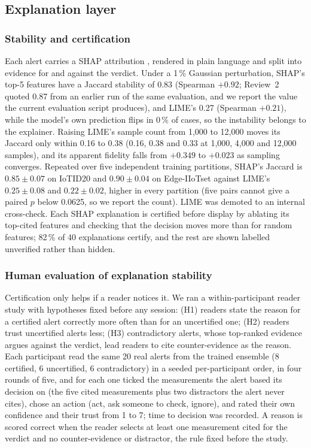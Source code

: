 \subsection{Explanation layer}\label{sec:xai}
\subsubsection{Stability and certification}
Each alert carries a SHAP attribution \cite{lundberg2017}, rendered in plain language and split into evidence for and against the verdict. Under a 1\,\% Gaussian perturbation, SHAP's top-5 features have a Jaccard stability of 0.83 (Spearman $+0.92$; Review~2 quoted 0.87 from an earlier run of the same evaluation, and we report the value the current evaluation script produces), and LIME's \cite{ribeiro2016} 0.27 (Spearman $+0.21$), while the model's own prediction flips in 0\,\% of cases, so the instability belongs to the explainer. Raising LIME's sample count from 1,000 to 12,000 moves its Jaccard only within 0.16 to 0.38 (0.16, 0.38 and 0.33 at 1,000, 4,000 and 12,000 samples), and its apparent fidelity falls from $+0.349$ to $+0.023$ as sampling converges. Repeated over five independent training partitions, SHAP's Jaccard is $0.85 \pm 0.07$ on IoTID20 and $0.90 \pm 0.04$ on Edge-IIoTset against LIME's $0.25 \pm 0.08$ and $0.22 \pm 0.02$, higher in every partition (five pairs cannot give a paired $p$ below 0.0625, so we report the count). LIME was demoted to an internal cross-check. Each SHAP explanation is certified before display by ablating its top-cited features and checking that the decision moves more than for random features; 82\,\% of 40 explanations certify, and the rest are shown labelled unverified rather than hidden.

\subsubsection{Human evaluation of explanation stability}
Certification only helps if a reader notices it. We ran a within-participant reader study with hypotheses fixed before any session: (H1) readers state the reason for a certified alert correctly more often than for an uncertified one; (H2) readers trust uncertified alerts less; (H3) contradictory alerts, whose top-ranked evidence argues against the verdict, lead readers to cite counter-evidence as the reason. Each participant read the same 20 real alerts from the trained ensemble (8 certified, 6 uncertified, 6 contradictory) in a seeded per-participant order, in four rounds of five, and for each one ticked the measurements the alert based its decision on (the five cited measurements plus two distractors the alert never cites), chose an action (act, ask someone to check, ignore), and rated their own confidence and their trust from 1 to 7; time to decision was recorded. A reason is scored correct when the reader selects at least one measurement cited for the verdict and no counter-evidence or distractor, the rule fixed before the study.

